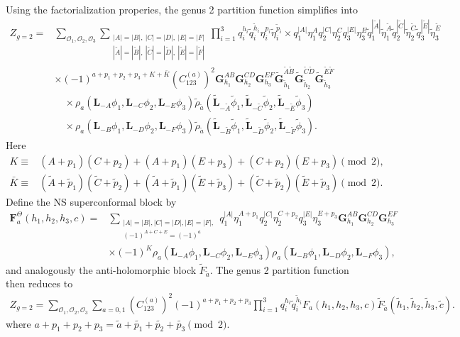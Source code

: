 \documentclass[12pt]{article}
\newcommand{\ie}{\begin{equation}\begin{aligned}}
\newcommand{\fe}{\end{aligned}\end{equation}}
\numberwithin{equation}{section}
\begin{document}
Using the factorialization properies, the genus 2 partition function simplifies into
\ie
Z_{g=2}
={}&
\sum_{\mathcal{O}_1,\mathcal{O}_2,\mathcal{O}_3}
\sum_{\substack{
|A|=|B|,\ |C|=|D|,\ |E|=|F|\\
|\widetilde A|=|\widetilde B|,\ 
|\widetilde C|=|\widetilde D|,\ 
|\widetilde E|=|\widetilde F|
}}
\prod_{i=1}^{3}
q_i^{h_i}\widetilde q_i^{\widetilde h_i} \eta_i^{p_i} \widetilde \eta_i^{\tilde{p}_i}
\times
q_1^{|A|}\eta_1^A
q_2^{|C|}\eta_2^C
q_3^{|E|}\eta_3^E
\widetilde q_1^{|\widetilde A|}
\widetilde\eta_1^{\widetilde A}
\widetilde q_2^{|\widetilde C|}
\widetilde\eta_2^{\widetilde C}
\widetilde q_3^{|\widetilde E|}
\widetilde\eta_3^{\widetilde E}
\\
&\times
(-1)^{a+p_1+p_2+p_3+K +\bar{K}}
\left(C_{123}^{(a)}\right)^2 \mathbf{G}_{h_1}^{AB}
\mathbf{G}_{h_2}^{CD}
\mathbf{G}_{h_3}^{EF}
\widetilde{\mathbf{G}}_{\widetilde h_1}^{\widetilde A\widetilde B}
\widetilde{\mathbf{G}}_{\widetilde h_2}^{\widetilde C\widetilde D}
\widetilde{\mathbf{G}}_{\widetilde h_3}^{\widetilde E\widetilde F}
\\
&\quad\times
\rho_a\!\left(
\mathbf{L}_{-A}\phi_1,
\mathbf{L}_{-C}\phi_2,
\mathbf{L}_{-E}\phi_3
\right)
\widetilde{\rho}_{\tilde{a}}\!\left(
\widetilde{\mathbf{L}}_{-\widetilde A}\widetilde{\phi}_1,
\widetilde{\mathbf{L}}_{-\widetilde C}\widetilde{\phi}_2,
\widetilde{\mathbf{L}}_{-\widetilde E}\widetilde{\phi}_3
\right)
\\
&\quad\times
\rho_a\!\left(
\mathbf{L}_{-B}\phi_1,
\mathbf{L}_{-D}\phi_2,
\mathbf{L}_{-F}\phi_3
\right)
\widetilde{\rho}_{\tilde{a}}\!\left(
\widetilde{\mathbf{L}}_{-\widetilde B}\widetilde{\phi}_1,
\widetilde{\mathbf{L}}_{-\widetilde D}\widetilde{\phi}_2,
\widetilde{\mathbf{L}}_{-\widetilde F}\widetilde{\phi}_3
\right).
\fe
Here
\ie
K
\equiv{}&
(A+p_1)(C+p_2)
+(A+p_1)(E+p_3)
+(C+p_2)(E+p_3)
\pmod{2},
\\
\bar{K}
\equiv{}&
(\widetilde A+\widetilde p_1)
(\widetilde C+\widetilde p_2)
+
(\widetilde A+\widetilde p_1)
(\widetilde E+\widetilde p_3)
+
(\widetilde C+\widetilde p_2)
(\widetilde E+\widetilde p_3)
\pmod{2}.
\fe
Define the NS superconformal block by
\ie \label{NSblockThetaDefinition}
\mathbf{F}^{\Theta}_a(h_1, h_2, h_3, c)= & \sum_{\substack{|A|=|B|,|C|=|D|,|E|=|F|,\\ (-1)^{A+C+E}=(-1)^a}} q_1^{|A|}\eta_1^{A+p_1} q_2^{|C|} \eta_2^{C+p_2} q_3^{|E|} \eta_3^{E+p_3} \mathbf{G}_{h_1}^{A B} \mathbf{G}_{h_2}^{C D} \mathbf{G}_{h_3}^{E F} \\
& \times (-1)^{K}\rho_a(\mathbf{L}_{-A} \phi_1, \mathbf{L}_{-C} \phi_2, \mathbf{L}_{-E} \phi_3) \rho_a(\mathbf{L}_{-B} \phi_1, \mathbf{L}_{-D} \phi_2, \mathbf{L}_{-F} \phi_3) ,
\fe
and analogously the anti-holomorphic block $\widetilde{F}_{\tilde{a}}$. The genus 2 partition function then reduces to
\ie
Z_{g=2} = \sum_{\mathcal{O}_1,\mathcal{O}_2,\mathcal{O}_3} \sum_{a=0,1}  \left(C^{(a)}_{123} \right)^2(-1)^{a+p_1+p_2+p_3} \prod_{i=1}^{3}
q_i^{h_i}\widetilde q_i^{\widetilde h_i} F_a(h_1, h_2, h_3, c) \widetilde{F}_{\tilde{a}} (\tilde{h}_1,\tilde{h}_2, \tilde{h}_3, \tilde{c}).
\fe
where $a+p_1+p_2+p_3 = \tilde{a}+\tilde{p_1}+\tilde{p_2}+\tilde{p_3} \pmod 2$.
\end{document}
